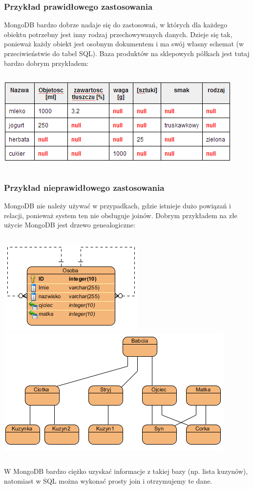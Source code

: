 \documentclass{beamer}
\begin{document}
  \begin{frame}
    \frametitle{Przykład prawidłowego zastosowania}
	MongoDB bardzo dobrze nadaje się do zastosowań, w których dla każdego obiektu potrzebny jest inny rodzaj przechowywanych danych. Dzieje się tak, ponieważ każdy obiekt jest osobnym dokumentem i ma swój własny schemat (w przeciwieństwie do tabel SQL). Baza produktów na sklepowych półkach jest tutaj bardzo dobrym przykładem:
	\begin{columns}
      

	  \includegraphics[scale=0.53]{img/table.png}
	\end{columns}
  \end{frame}

  \begin{frame}
    \frametitle{Przykład nieprawidłowego zastosowania}
	MongoDB nie należy używać w przypadkach, gdzie istnieje dużo powiązań i relacji, ponieważ system ten nie obsługuje joinów. Dobrym przykładem na złe użycie MongoDB jest drzewo genealogiczne:
	\begin{columns}
	  \includegraphics[scale=0.6]{img/bad-example1.png}
	  \includegraphics[scale=0.6]{img/bad-example2.png}
	\end{columns}
	
	W MongoDB bardzo ciężko uzyskać informacje z takiej bazy (np. lista kuzynów), natomiast w SQL można wykonać prosty join i otrzymujemy te dane.
  \end{frame}
\end{document}

